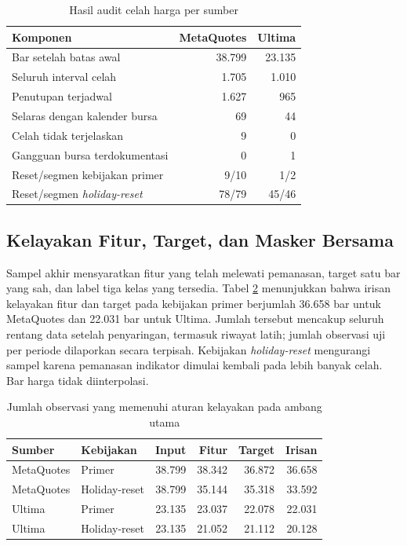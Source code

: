 \begin{table}[htbp]
\centering
\small
\setlength{\tabcolsep}{4pt}
\caption{Hasil audit celah harga per sumber}
\label{tab:hasil-audit-celah}
\begin{tabular}{p{7.2cm}rr}
\toprule
Komponen & MetaQuotes & Ultima \\
\midrule
Bar setelah batas awal & 38.799 & 23.135 \\
Seluruh interval celah & 1.705 & 1.010 \\
Penutupan terjadwal & 1.627 & 965 \\
Selaras dengan kalender bursa & 69 & 44 \\
Celah tidak terjelaskan & 9 & 0 \\
Gangguan bursa terdokumentasi & 0 & 1 \\
Reset/segmen kebijakan primer & 9/10 & 1/2 \\
Reset/segmen \emph{holiday-reset} & 78/79 & 45/46 \\
\bottomrule
\end{tabular}
\end{table}


\subsection{Kelayakan Fitur, Target, dan Masker Bersama}

Sampel akhir mensyaratkan fitur yang telah melewati pemanasan, target satu bar yang sah, dan label tiga kelas yang tersedia. Tabel \ref{tab:hasil-kelayakan} menunjukkan bahwa irisan kelayakan fitur dan target pada kebijakan primer berjumlah 36.658 bar untuk MetaQuotes dan 22.031 bar untuk Ultima. Jumlah tersebut mencakup seluruh rentang data setelah penyaringan, termasuk riwayat latih; jumlah observasi uji per periode dilaporkan secara terpisah. Kebijakan \emph{holiday-reset} mengurangi sampel karena pemanasan indikator dimulai kembali pada lebih banyak celah. Bar harga tidak diinterpolasi.


\begin{table}[htbp]
\centering
\small
\setlength{\tabcolsep}{4pt}
\caption{Jumlah observasi yang memenuhi aturan kelayakan pada ambang utama}
\label{tab:hasil-kelayakan}
\begin{tabular}{llrrrr}
\toprule
Sumber & Kebijakan & Input & Fitur & Target & Irisan \\
\midrule
MetaQuotes & Primer & 38.799 & 38.342 & 36.872 & 36.658 \\
MetaQuotes & Holiday-reset & 38.799 & 35.144 & 35.318 & 33.592 \\
Ultima & Primer & 23.135 & 23.037 & 22.078 & 22.031 \\
Ultima & Holiday-reset & 23.135 & 21.052 & 21.112 & 20.128 \\
\bottomrule
\end{tabular}
\end{table}


